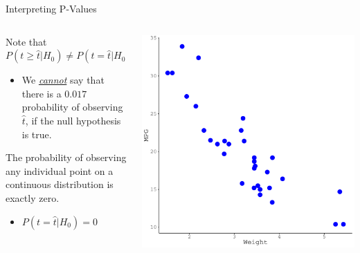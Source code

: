\documentclass[10pt]{beamer}\usepackage[]{graphicx}\usepackage[]{color}
\makeatletter
\def\maxwidth{ %
  \ifdim\Gin@nat@width>\linewidth
    \linewidth
  \else
    \Gin@nat@width
  \fi
}
\newenvironment{knitrout}{}{} %
\makeatother
\begin{document}

\begin{frame}{Interpreting P-Values}

\begin{columns}
  \begin{column}{0.5\textwidth}

    Note that $P(t \geq \hat{t}|H_0) \neq P(t = \hat{t}|H_0)$
    \begin{itemize}
    \item We \emph{\underline{cannot}} say that there is a
      $0.017$ probability of observing $\hat{t}$, if the null
      hypothesis is true.
    \end{itemize}
    \vb
    The probability of observing any individual point on a continuous
    distribution is exactly zero.
    \vc
    \begin{itemize}
    \item $P(t = \hat{t}|H_0) = 0$
    \end{itemize}

  \end{column}
  \begin{column}{0.5\textwidth}

\begin{knitrout}\footnotesize
{}\color{fgcolor}

{\centering \includegraphics[width=\maxwidth]{figure/unnamed-chunk-17-1} 

}


\end{knitrout}

\end{column}
\end{columns}

\end{frame}
\end{document}
